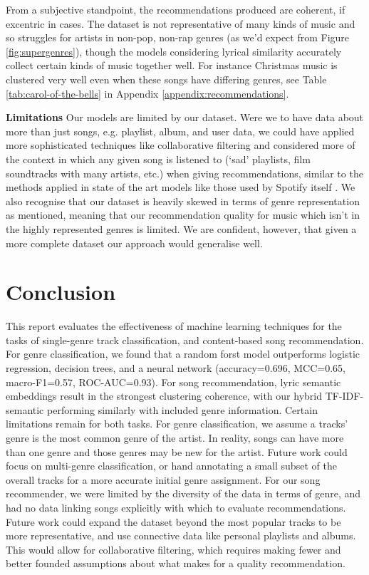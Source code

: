 \documentclass{article}
\newcommand{\minisection}[1]{\textbf{#1}\quad}
\begin{document}
From a subjective standpoint, the recommendations produced are coherent, if excentric in cases. The dataset is not representative of many kinds of music and so struggles for artists in non-pop, non-rap genres (as we'd expect from Figure \ref{fig:supergenres}), though the models considering lyrical similarity accurately collect certain kinds of music together well. For instance Christmas music is clustered very well even when these songs have differing genres, see Table \ref{tab:carol-of-the-bells} in Appendix \ref{appendix:recommendations}.

\minisection{Limitations} Our models are limited by our dataset. Were we to have data about more than just songs, e.g. playlist, album, and user data, we could have applied more sophisticated techniques like collaborative filtering and considered more of the context in which any given song is listened to (`sad' playlists, film soundtracks with many artists, etc.) when giving recommendations, similar to the methods applied in state of the art models like those used by Spotify itself \citep{Wong_2024}. We also recognise that our dataset is heavily skewed in terms of genre representation as mentioned, meaning that our recommendation quality for music which isn't in the highly represented genres is limited. We are confident, however, that given a more complete dataset our approach would generalise well.

\vspace{-3mm}
\section{Conclusion}
\vspace{-3mm}
This report evaluates the effectiveness of machine learning techniques for the tasks of single-genre track classification, and content-based song recommendation. For genre classification, we found that a random forst model outperforms logistic regression, decision trees, and a neural network (accuracy=0.696, MCC=0.65, macro-F1=0.57, ROC-AUC=0.93). For song recommendation, lyric semantic embeddings result in the strongest clustering coherence, with our hybrid TF-IDF-semantic performing similarly with included genre information. Certain limitations remain for both tasks. For genre classification, we assume a tracks' genre is the most common genre of the artist. In reality, songs can have more than one genre and those genres may be new for the artist. Future work could focus on multi-genre classification, or hand annotating a small subset of the overall tracks for a more accurate initial genre assignment. For our song recommender, we were limited by the diversity of the data in terms of genre, and had no data linking songs explicitly with which to evaluate recommendations. Future work could expand the dataset beyond the most popular tracks to be more representative, and use connective data like personal playlists and albums. This would allow for collaborative filtering, which requires making fewer and better founded assumptions about what makes for a quality recommendation.
\end{document}
